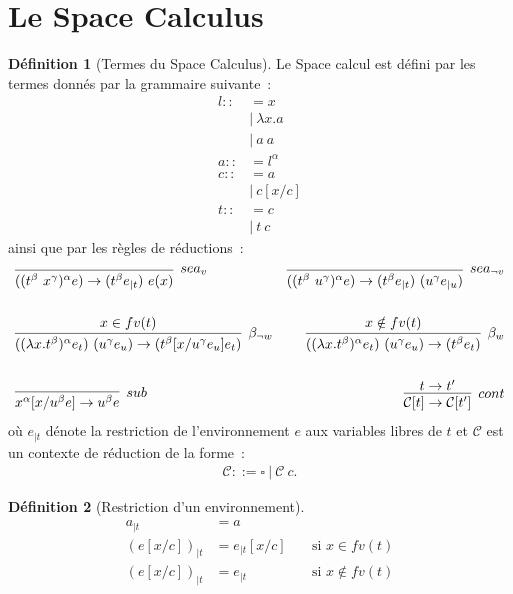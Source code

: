 \documentclass[11pt,a4paper]{article}
\theoremstyle{definition}
\newtheorem{definition}{Définition}[section]
\begin{document}
\section{Le Space Calculus}

\begin{definition}[Termes du Space Calculus]
Le Space calcul est défini par les termes donnés par la grammaire suivante~:
\begin{align*}
    l ::&= x \\
    &|~\lambda x.a \\
    &|~a~a\\
    a ::&= l^{\alpha}\\
    c ::&= a\\
        &|~c[x/c]\\
    t ::&= c\\
        &|~t~c
\end{align*}
ainsi que par les règles de réductions~:
\begin{align*}
&\infer[sea_v]{((t^\beta~x^\gamma)^\alpha e) \rightarrow (t^\beta e_{|t})~e(x)}{}
&\infer[sea_{\neg v}]{((t^\beta~u^\gamma)^\alpha e) \rightarrow (t^\beta e_{|t})~(u^\gamma e_{|u}) }{}\\\\
&\infer[\beta_{\neg w}]{((\lambda x .t^\beta)^\alpha e_t)~(u^\gamma e_u ) \rightarrow (t^\beta[x/u^\gamma e_u]e_t)}{x \in fv(t) }
&\infer[\beta_w]{((\lambda x .t^\beta)^\alpha e_t)~(u^\gamma e_u ) \rightarrow (t^\beta e_t)}{x \notin fv(t) }\\\\
&\infer[sub]{x^\alpha[x/u^\beta e] \rightarrow u^\beta e}{}
&\infer[cont]{\mathcal{C}[t] \rightarrow \mathcal{C}[t']}{t\rightarrow t'}
\end{align*}
où $e_{|t}$ dénote la restriction de l'environnement $e$ aux variables libres de $t$ et 
$\mathcal{C}$ est un contexte de réduction de la forme~:
\begin{align*}
  \mathcal{C} ::= \square~|~\mathcal{C}~c.
\end{align*}

\end{definition}
\begin{definition}[Restriction d'un environnement]
\begin{align*}
a_{|t} &= a\\
    (e[x/c])_{|t} &= e_{|t}[x/c] \quad &\text{si } x\in fv(t)\\
    (e[x/c])_{|t} &= e_{|t} \quad &\text{si } x\notin fv(t)
\end{align*}
\end{definition}
\end{document}
